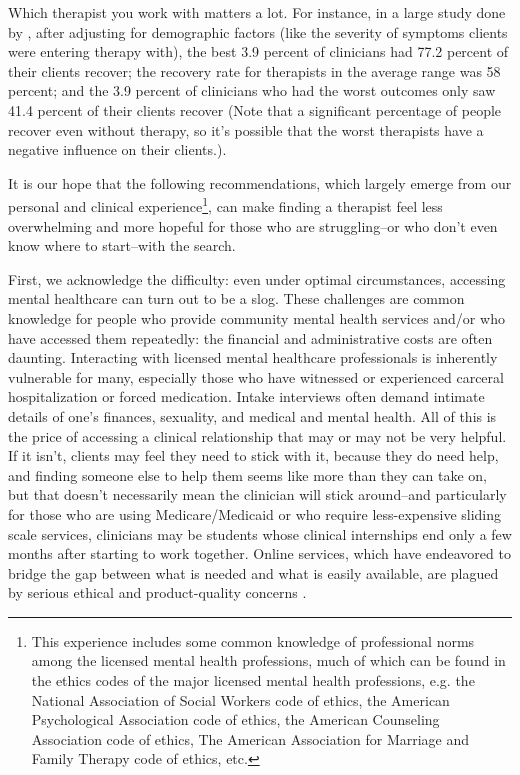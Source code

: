 \documentclass[12pt,letterpaper]{book}
\begin{document}
Which therapist you work with matters a lot. For instance, in a large study done by \textcite{firth2019therapistEffects}, after adjusting for demographic factors (like the severity of symptoms clients were entering therapy with), the best 3.9 percent of clinicians had 77.2 percent of their clients recover; the recovery rate for therapists in the average range was 58 percent; and the 3.9 percent of clinicians who had the worst outcomes only saw 41.4 percent of their clients recover (Note that a significant percentage of people recover even without therapy, so it's possible that the worst therapists have a negative influence on their clients.).

It is our hope that the following recommendations, which largely emerge from our personal and clinical experience\footnote{This experience includes some common knowledge of professional norms among the licensed mental health professions, much of which can be found in the ethics codes of the major licensed mental health professions, e.g. the National Association of Social Workers code of ethics, the American Psychological Association code of ethics, the American Counseling Association code of ethics, The American Association for Marriage and Family Therapy code of ethics, etc.}, can make finding a therapist feel less overwhelming and more hopeful for those who are struggling–or who don't even know where to start–with the search.

First, we acknowledge the difficulty: even under optimal circumstances, accessing mental healthcare can turn out to be a slog. These challenges are common knowledge for people who provide community mental health services and/or who have accessed them repeatedly: the financial and administrative costs are often daunting. Interacting with licensed mental healthcare professionals is inherently vulnerable for many, especially those who have witnessed or experienced carceral hospitalization or forced medication. Intake interviews often demand intimate details of one's finances, sexuality, and medical and mental health. All of this is the price of accessing a clinical relationship that may or may not be very helpful. If it isn't, clients may feel they need to stick with it, because they do need help, and finding someone else to help them seems like more than they can take on, but that doesn't necessarily mean the clinician will stick around–and particularly for those who are using Medicare/Medicaid or who require less-expensive sliding scale services, clinicians may be students whose clinical internships end only a few months after starting to work together. Online services, which have endeavored to bridge the gap between what is needed and what is easily available, are plagued by serious ethical and product-quality concerns \cite{betterhelp1,betterhelp2,betterhelp3,talkspace1,doneglobal1}.
\end{document}
